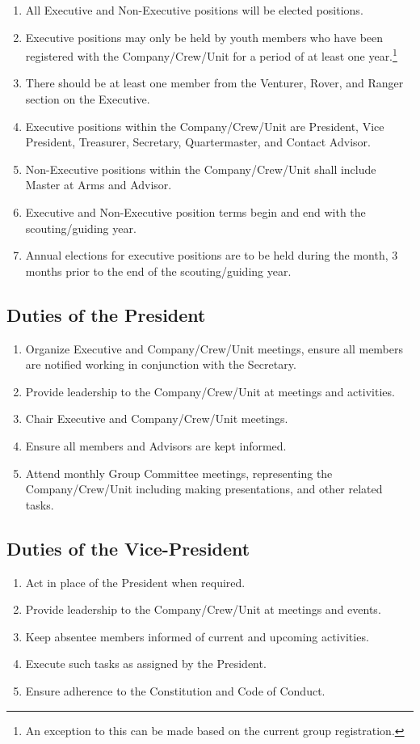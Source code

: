 \begin{enumerate}
    \item All Executive and Non-Executive positions will be elected positions.
    \item Executive positions may only be held by youth members who have been registered with the Company/Crew/Unit for a period of at least one year.\footnote{An exception to this can be made based on the current group registration.}
    \item There should be at least one member from the Venturer, Rover, and Ranger section on the Executive.\footnotemark[\value{footnote}]
    \item Executive positions within the Company/Crew/Unit are President, Vice President, Treasurer, Secretary, Quartermaster, and Contact Advisor.
    \item Non-Executive positions within the Company/Crew/Unit shall include Master at Arms and Advisor.
    \item Executive and Non-Executive position terms begin and end with the scouting/guiding year.
    \item Annual elections for executive positions are to be held during the month, 3 months prior to the end of the scouting/guiding year.
\end{enumerate}

\subsection{Duties of the President}\label{subsec:duties-of-the-president}
\begin{enumerate}
    \item Organize Executive and Company/Crew/Unit meetings, ensure all members are notified working in conjunction with the Secretary.
    \item Provide leadership to the Company/Crew/Unit at meetings and activities.
    \item Chair Executive and Company/Crew/Unit meetings.
    \item Ensure all members and Advisors are kept informed.
    \item Attend monthly Group Committee meetings, representing the Company/Crew/Unit including making presentations, and other related tasks.
\end{enumerate}

\subsection{Duties of the Vice-President}\label{subsec:duties-of-the-vice-president}
\begin{enumerate}
    \item Act in place of the President when required.
    \item Provide leadership to the Company/Crew/Unit at meetings and events.
    \item Keep absentee members informed of current and upcoming activities.
    \item Execute such tasks as assigned by the President.
    \item Ensure adherence to the Constitution and Code of Conduct.
\end{enumerate}

